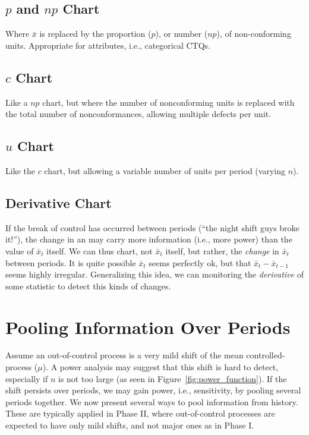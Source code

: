 \subsection{$p$ and $np$ Chart}
Where $\bar{x}$ is replaced by the proportion ($p$), or number ($np$), of non-conforming units.
Appropriate for attributes, i.e., categorical CTQs.
\subsection{$c$ Chart}
Like a $np$ chart, but where the number of nonconforming units is replaced with the total number of nonconformances, allowing multiple defects per unit. 
\subsection{$u$ Chart}
Like the $c$ chart, but allowing a variable number of units per period (varying $n$).



\subsection{Derivative Chart}
If the break of control has occurred between periods (``the night shift guys broke it!''), the change in an \barxChart may carry more information (i.e., more power) than the value of $\bar{x}_t$ itself.
We can thus chart, not $\bar{x}_t$ itself, but rather, the \emph{change} in $\bar{x}_t$ between periods. 
It is quite possible $\bar{x}_t$ seems perfectly ok, but that $\bar{x}_t-\bar{x}_{t-1}$ seems highly irregular. 
Generalizing this idea, we can monitoring the \emph{derivative} of some statistic to detect this kinds of changes. 


\section{Pooling Information Over Periods}
\label{sec:running_windows}

Assume an out-of-control process is a very mild shift of the mean controlled-process ($\mu$).
A power analysis may suggest that this shift is hard to detect, especially if $n$ is not too large (as seen in Figure~\ref{fig:power_function}).  
If the shift persists over periods, we may gain power, i.e., sensitivity, by pooling several periods together. 
We now present several ways to pool information from history. These are typically applied in Phase II, where out-of-control processes are expected to have only mild shifts, and not major ones as in Phase I. 

